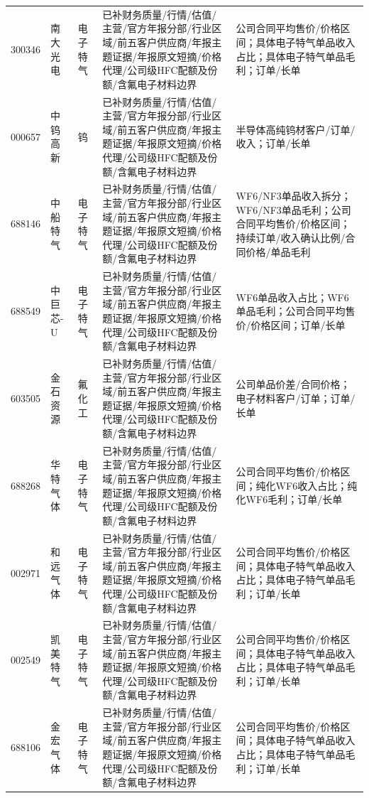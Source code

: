 \begin{exhibitbox}[数据补齐与剩余缺口]
{\begin{tabular}{lllll}
300346 & 南大光电 & 电子特气 & 已补财务质量/行情/估值/主营/官方年报分部/行业区域/前五客户供应商/年报主题证据/年报原文短摘/价格代理/公司级HFC配额及份额/含氟电子材料边界 & 公司合同平均售价/价格区间；具体电子特气单品收入占比；具体电子特气单品毛利；订单/长单 \\
000657 & 中钨高新 & 钨 & 已补财务质量/行情/估值/主营/官方年报分部/行业区域/前五客户供应商/年报主题证据/年报原文短摘/价格代理/公司级HFC配额及份额/含氟电子材料边界 & 半导体高纯钨材客户/订单/收入；订单/长单 \\
688146 & 中船特气 & 电子特气 & 已补财务质量/行情/估值/主营/官方年报分部/行业区域/前五客户供应商/年报主题证据/年报原文短摘/价格代理/公司级HFC配额及份额/含氟电子材料边界 & WF6/NF3单品收入拆分；WF6/NF3单品毛利；公司合同平均售价/价格区间；持续订单/收入确认比例/合同价格/单品毛利 \\
688549 & 中巨芯-U & 电子特气 & 已补财务质量/行情/估值/主营/官方年报分部/行业区域/前五客户供应商/年报主题证据/年报原文短摘/价格代理/公司级HFC配额及份额/含氟电子材料边界 & WF6单品收入占比；WF6单品毛利；公司合同平均售价/价格区间；订单/长单 \\
603505 & 金石资源 & 氟化工 & 已补财务质量/行情/估值/主营/官方年报分部/行业区域/前五客户供应商/年报主题证据/年报原文短摘/价格代理/公司级HFC配额及份额/含氟电子材料边界 & 公司单品价差/合同价格；电子材料客户/订单；订单/长单 \\
688268 & 华特气体 & 电子特气 & 已补财务质量/行情/估值/主营/官方年报分部/行业区域/前五客户供应商/年报主题证据/年报原文短摘/价格代理/公司级HFC配额及份额/含氟电子材料边界 & 公司合同平均售价/价格区间；纯化WF6收入占比；纯化WF6毛利；订单/长单 \\
002971 & 和远气体 & 电子特气 & 已补财务质量/行情/估值/主营/官方年报分部/行业区域/前五客户供应商/年报主题证据/年报原文短摘/价格代理/公司级HFC配额及份额/含氟电子材料边界 & 公司合同平均售价/价格区间；具体电子特气单品收入占比；具体电子特气单品毛利；订单/长单 \\
002549 & 凯美特气 & 电子特气 & 已补财务质量/行情/估值/主营/官方年报分部/行业区域/前五客户供应商/年报主题证据/年报原文短摘/价格代理/公司级HFC配额及份额/含氟电子材料边界 & 公司合同平均售价/价格区间；具体电子特气单品收入占比；具体电子特气单品毛利；订单/长单 \\
688106 & 金宏气体 & 电子特气 & 已补财务质量/行情/估值/主营/官方年报分部/行业区域/前五客户供应商/年报主题证据/年报原文短摘/价格代理/公司级HFC配额及份额/含氟电子材料边界 & 公司合同平均售价/价格区间；具体电子特气单品收入占比；具体电子特气单品毛利；订单/长单 \\
\bottomrule
\end{tabular}
}
\end{exhibitbox}

